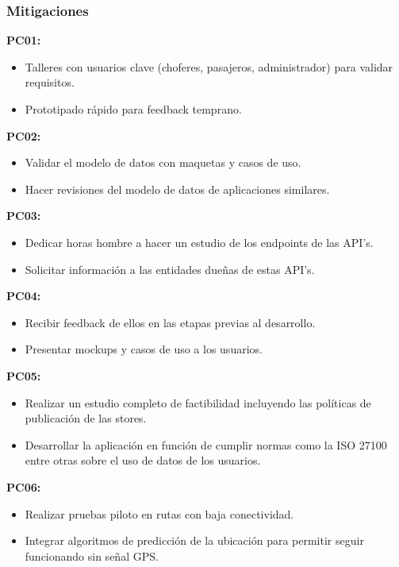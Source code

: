 \documentclass[12pt]{article}
\begin{document}
\subsubsection{Mitigaciones}
    \textbf{PC01:} 
    \begin{itemize}
        \item Talleres con usuarios clave (choferes, pasajeros, administrador) para validar requisitos.
        \item Prototipado rápido para feedback temprano.
    \end{itemize}
    \textbf{PC02:}
    \begin{itemize}
        \item Validar el modelo de datos con maquetas y casos de uso.
        \item Hacer revisiones del modelo de datos de aplicaciones similares.
    \end{itemize}
    \textbf{PC03:}
    \begin{itemize}
        \item Dedicar horas hombre a hacer un estudio de los endpoints de las API's.
        \item Solicitar información a las entidades dueñas de estas API's.
    \end{itemize}
    \textbf{PC04:}
    \begin{itemize}
        \item Recibir feedback de ellos en las etapas previas al desarrollo.
        \item Presentar mockups y casos de uso a los usuarios.
    \end{itemize}
    \textbf{PC05:}
    \begin{itemize}
        \item Realizar un estudio completo de factibilidad incluyendo las políticas de publicación de las stores.
        \item Desarrollar la aplicación en función de cumplir normas como la ISO 27100 entre otras sobre el uso de datos de los usuarios.
    \end{itemize}
    \textbf{PC06:}
    \begin{itemize}
        \item Realizar pruebas piloto en rutas con baja conectividad.
        \item Integrar algoritmos de predicción de la ubicación para permitir seguir funcionando sin señal GPS.
    \end{itemize}

\newpage
\end{document}
